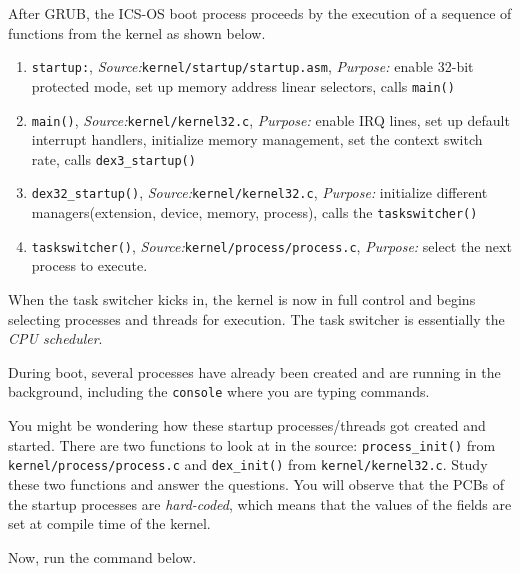 \documentclass[a4paper, 11pt,oneside]{article}
\begin{document}
After GRUB, the ICS-OS boot process proceeds by the execution of a sequence of functions from the kernel as shown below. 

\begin{enumerate}[itemsep=0pt,parsep=0pt]
    \item{\texttt{startup:}, \textit{Source:}\texttt{kernel/startup/startup.asm}, \textit{Purpose:} enable 32-bit protected mode, set up memory address linear selectors, calls \texttt{main()}}
    
    \item{\texttt{main()}, \textit{Source:}\texttt{kernel/kernel32.c}, \textit{Purpose:} enable IRQ lines, set up default interrupt handlers, initialize memory management, set the context switch rate, calls \texttt{dex3\_startup()}}

    \item{\texttt{dex32\_startup()}, \textit{Source:}\texttt{kernel/kernel32.c}, 
\textit{Purpose:} initialize different managers(extension, device, memory, process), calls the \texttt{taskswitcher()}}
	
	\item{\texttt{taskswitcher()}, \textit{Source:}\texttt{kernel/process/process.c}, 
\textit{Purpose:} select the next process to execute.}
\end{enumerate}   

When the task switcher kicks in, the kernel is now in full control and begins selecting processes and threads for execution. The task switcher is essentially the \textit{CPU scheduler}. 

During boot, several processes have already been created and are running in the background, 
including the \texttt{console} where you are typing commands. 

You might be wondering how these startup processes/threads got created and started. There are two functions to look at in the source:  \texttt{process\_init()} from \texttt{kernel/process/process.c} and \texttt{dex\_init()} from \texttt{kernel/kernel32.c}. Study these two functions and answer the questions. You will observe that 
the PCBs of the startup processes are \textit{hard-coded}, which means that the values of the fields are 
set at compile time of the kernel.

Now, run the command below.

\begin{Verbatim}[frame=single]
% ps
\end{Verbatim}
\end{document}
